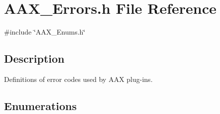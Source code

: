 \hypertarget{a00494}{}\section{A\+A\+X\+\_\+\+Errors.\+h File Reference}
\label{a00494}
{\ttfamily \#include \char`\"{}A\+A\+X\+\_\+\+Enums.\+h\char`\"{}}\newline


\subsection{Description}
Definitions of error codes used by A\+AX plug-\/ins. 

\subsection*{Enumerations}
